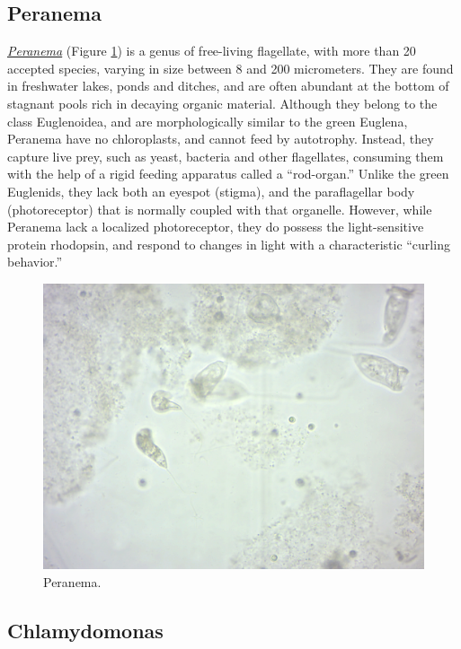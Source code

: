\subsection{Peranema}\label{peranema}

\href{https://en.wikipedia.org/wiki/Peranema}{\emph{Peranema}} (Figure
\ref{fig:peranema}) is a genus of free-living flagellate, with more than
20 accepted species, varying in size between 8 and 200 micrometers. They
are found in freshwater lakes, ponds and ditches, and are often abundant
at the bottom of stagnant pools rich in decaying organic material.
Although they belong to the class Euglenoidea, and are morphologically
similar to the green Euglena, Peranema have no chloroplasts, and cannot
feed by autotrophy. Instead, they capture live prey, such as yeast,
bacteria and other flagellates, consuming them with the help of a rigid
feeding apparatus called a ``rod-organ.'' Unlike the green Euglenids,
they lack both an eyespot (stigma), and the paraflagellar body
(photoreceptor) that is normally coupled with that organelle. However,
while Peranema lack a localized photoreceptor, they do possess the
light-sensitive protein rhodopsin, and respond to changes in light with
a characteristic ``curling behavior.''

\begin{figure}

{\centering \includegraphics[width=0.7\linewidth]{./figures/protists/peranema} 

}

\caption{Peranema.}\label{fig:peranema}
\end{figure}

\subsection{Chlamydomonas}\label{chlamydomonas}

